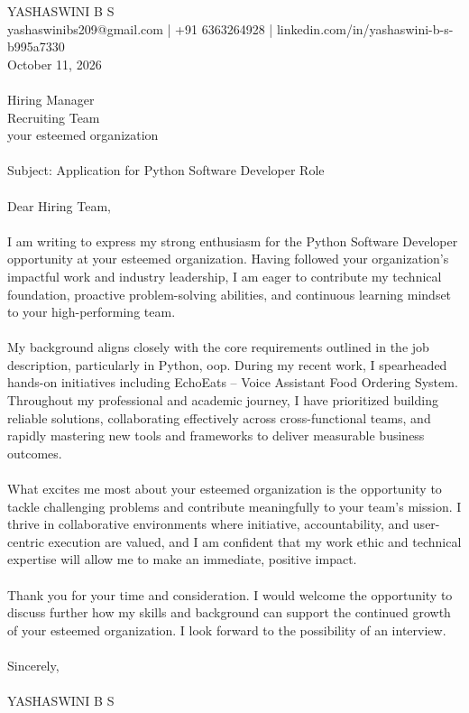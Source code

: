 \documentclass[11pt,a4paper]{article}
\begin{document}
YASHASWINI B S
 \\
yashaswinibs209@gmail.com | +91 6363264928 | linkedin.com/in/yashaswini-b-s-b995a7330
 \\
October 11, 2026
 \\

 \\
Hiring Manager
 \\
Recruiting Team
 \\
your esteemed organization
 \\

 \\
Subject: Application for Python Software Developer Role
 \\

 \\
Dear Hiring Team,
 \\

 \\
I am writing to express my strong enthusiasm for the Python Software Developer opportunity at your esteemed organization. Having followed your organization's impactful work and industry leadership, I am eager to contribute my technical foundation, proactive problem-solving abilities, and continuous learning mindset to your high-performing team.
 \\

 \\
My background aligns closely with the core requirements outlined in the job description, particularly in Python, oop. During my recent work, I spearheaded hands-on initiatives including EchoEats – Voice Assistant Food Ordering System. Throughout my professional and academic journey, I have prioritized building reliable solutions, collaborating effectively across cross-functional teams, and rapidly mastering new tools and frameworks to deliver measurable business outcomes.
 \\

 \\
What excites me most about your esteemed organization is the opportunity to tackle challenging problems and contribute meaningfully to your team's mission. I thrive in collaborative environments where initiative, accountability, and user-centric execution are valued, and I am confident that my work ethic and technical expertise will allow me to make an immediate, positive impact.
 \\

 \\
Thank you for your time and consideration. I would welcome the opportunity to discuss further how my skills and background can support the continued growth of your esteemed organization. I look forward to the possibility of an interview.
 \\

 \\
Sincerely,
 \\

 \\
YASHASWINI B S \par \vspace{10pt}
\end{document}
